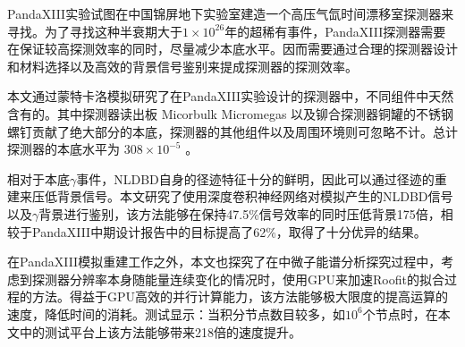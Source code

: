 
\begin{cabstract}
	\pkuthssffaq %
	PandaXIII实验试图在中国锦屏地下实验室建造一个高压气氙时间漂移室探测器来寻找。为了寻找这种半衰期大于$1\times10^{26}$年的超稀有事件，PandaXIII探测器需要在保证较高探测效率的同时，尽量减少本底水平。因而需要通过合理的探测器设计和材料选择以及高效的背景信号鉴别来提成探测器的探测效率。

	本文通过蒙特卡洛模拟研究了在PandaXIII实验设计的探测器中，不同组件中天然含有的。其中探测器读出板 Micorbulk Micromegas 以及铆合探测器铜罐的不锈钢螺钉贡献了绝大部分的本底，探测器的其他组件以及周围环境则可忽略不计。总计探测器的本底水平为 $308\times 10^{-5}$ \ckky。

	相对于本底$\gamma$事件，NLDBD自身的径迹特征十分的鲜明，因此可以通过径迹的重建来压低背景信号。本文研究了使用深度卷积神经网络对模拟产生的NLDBD信号以及$\gamma$背景进行鉴别，该方法能够在保持47.5\%信号效率的同时压低背景175倍，相较于PandaXIII中期设计报告中的目标提高了62\%，取得了十分优异的结果。

	在PandaXIII模拟重建工作之外，本文也探究了在中微子能谱分析探究过程中，考虑到探测器分辨率本身随能量连续变化的情况时，使用GPU来加速Roofit的拟合过程的方法。得益于GPU高效的并行计算能力，该方法能够极大限度的提高运算的速度，降低时间的消耗。测试显示：当积分节点数目较多，如$10^6$个节点时，在本文中的测试平台上该方法能够带来218倍的速度提升。

\end{cabstract}

